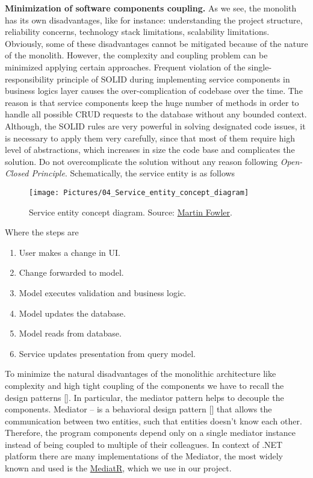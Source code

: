 \textbf{Minimization of software components coupling.} As we see, the monolith has its own disadvantages, like for instance:
understanding the project structure, reliability concerns, technology stack limitations, scalability limitations.
Obviously, some of these disadvantages cannot be mitigated because of the nature of the monolith.
However, the complexity and coupling problem can be minimized applying certain approaches.
Frequent violation of the single-responsibility principle of SOLID during implementing service components
in business logics layer causes the over-complication of codebase over the time.
The reason is that service components keep the huge number of methods in order to handle all possible CRUD requests
to the database without any bounded context.
Although, the SOLID rules are very powerful in solving designated code issues, it is necessary to apply them very carefully,
since that most of them require high level of abstractions, which increases in size the code base and complicates the
solution.
Do not overcomplicate the solution without any reason following \textit{Open-Closed Principle}.
Schematically, the service entity is as follows
\begin{figure}[H]
    \centering
    \texttt{[image: Pictures/04\_Service\_entity\_concept\_diagram]}
    \caption{Service entity concept diagram.
    Source: \href{https://martinfowler.com/bliki/CQRS.html}{Martin Fowler}.}\label{fig:figure9}
\end{figure}
Where the steps are
\begin{enumerate}
    \item User makes a change in UI\@.
    \item Change forwarded to model.
    \item Model executes validation and business logic.
    \item Model updates the database.
    \item Model reads from database.
    \item Service updates presentation from query model.
\end{enumerate}

To minimize the natural disadvantages of the monolithic architecture like complexity and high tight coupling of the components
we have to recall the design patterns [\cite{rising1998design}].
In particular, the mediator pattern helps to decouple the components.
Mediator -- is a behavioral design pattern [\cite{rasche2016building}] that allows the communication between two entities,
such that entities doesn't know each other.
Therefore, the program components depend only on a single mediator instance instead of being coupled to multiple of their
colleagues.
In context of .NET platform there are many implementations of the Mediator, the most widely known and used is the
\href{https://github.com/jbogard/MediatR}{MediatR}, which we use in our project.

